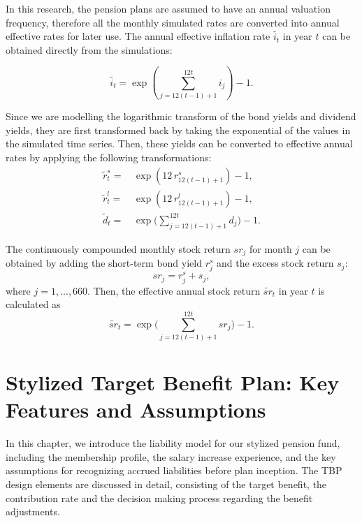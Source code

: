 \documentclass{sfuthesis}
\numberwithin{equation}{chapter}
\begin{document}
		\justify
		In this research, the pension plans are assumed to have an annual valuation frequency, therefore all the monthly simulated rates are converted into annual effective rates for later use. The annual effective inflation rate $\tilde{i_{t}}$ in year $t$ can be obtained directly from the simulations:
		
		\begin{equation}
		\label{eq:EMR_18}
		\tilde{i_{t}} = \exp\left(\sum_{j=12(t-1)+1}^{12t}i_{j}\right) - 1 .
		\end{equation}
	
	
		\justify
		Since we are modelling the logarithmic transform of the bond yields and dividend yields, they are first transformed back by taking the exponential of the values in the simulated time series. Then, these yields can be converted to effective annual rates by applying the following transformations:
		\begin{align}
		\tilde{r}_{t}^s = &\,\exp(12\,r_{12(t-1)+1}^s)-1,\\
		\tilde{r}_{t}^l = &\,\exp(12\,r_{12(t-1)+1}^l)-1,\\
		\tilde{d}_{t} = &\,\exp\bigg(\sum_{j=12(t-1)+1}^{12t}d_{j}\bigg) - 1.
		\end{align}
		
		\justify
		The continuously compounded monthly stock return $sr_{j}$ for month $j$ can be obtained by adding the short-term bond yield $r_{j}^s$ and the excess stock return $s_{j}$:
		\begin{equation}
		\label{eq:EMR_19}
		sr_{j} =  r_{j}^s + s_{j},
		\end{equation}
		where $j=1,...,660$. Then, the effective annual stock return $\widetilde{sr}_{t}$ in year $t$ is calculated as
		\begin{equation}
		\label{eq:EMR_20}
		\widetilde{sr}_{t} = \exp\bigg(\sum_{j=12(t-1)+1}^{12t}sr_{j}\bigg) - 1. 
		\end{equation}
	
	
	
	\chapter{Stylized Target Benefit Plan: Key Features and Assumptions}
	\label{Stylized Target Benefit Plan: Key Feature and Assumption}
	
		\justify
		In this chapter, we introduce the liability model for our stylized pension fund, including the membership profile, the salary increase experience, and the key assumptions for recognizing accrued liabilities before plan inception. The TBP design elements are discussed in detail, consisting of the target benefit, the contribution rate and the decision making process regarding the benefit adjustments. 
	
\end{document}
